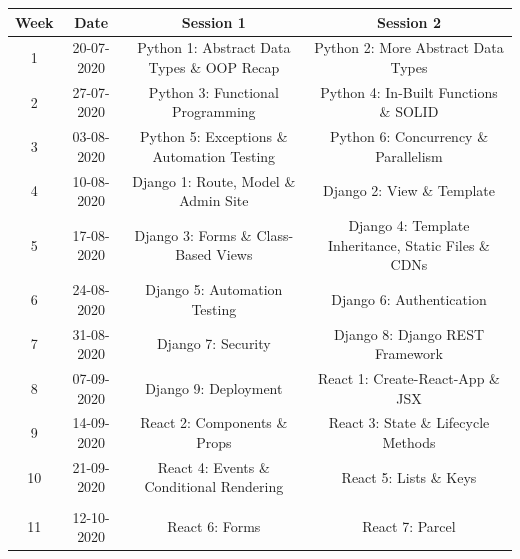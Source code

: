 \documentclass{article}
\begin{document}
\renewcommand{\arraystretch}{1.5}
\begin{tabular}{|c|c|c|c|}
	\hline
	\textbf{Week} & \textbf{Date}     & \textbf{Session 1}                                     & \textbf{Session 2}                                          \\ \hline
	\small 1      & \small 20-07-2020 & \small Python 1: Abstract Data Types \& OOP Recap      & \small Python 2: More Abstract Data Types                   \\ \hline
	\small 2      & \small 27-07-2020 & \small Python 3: Functional Programming                & \small Python 4: In-Built Functions \& SOLID                \\ \hline
	\small 3      & \small 03-08-2020 & \small Python 5: Exceptions \& Automation Testing      & \small Python 6: Concurrency \& Parallelism                 \\ \hline
	\small 4      & \small 10-08-2020 & \small Django 1: Route, Model \& Admin Site            & \small Django 2: View \& Template                           \\ \hline
	\small 5      & \small 17-08-2020 & \small Django 3: Forms \& Class-Based Views            & \small Django 4: Template Inheritance, Static Files \& CDNs \\ \hline
	\small 6      & \small 24-08-2020 & \small Django 5: Automation Testing                    & \small Django 6: Authentication                             \\ \hline
	\small 7      & \small 31-08-2020 & \small Django 7: Security                              & \small Django 8: Django REST Framework                      \\ \hline
	\small 8      & \small 07-09-2020 & \small Django 9: Deployment                            & \small React 1: Create-React-App \& JSX                     \\ \hline
	\small 9      & \small 14-09-2020 & \small React 2: Components \& Props        & \small React 3: State \& Lifecycle Methods                  \\ \hline
	\small 10     & \small 21-09-2020 & \small React 4: Events \& Conditional Rendering & \small React 5:  Lists \& Keys                              \\ \hline
	\rowcolor{yellow} \multicolumn{4}{|c|}{\small Mid Term Break}                                                             \\ \hline
	\small 11     & \small 12-10-2020 & \small React 6: Forms          & \small React 7: Parcel      \\ \hline                                           

\end{tabular}
\end{document}
